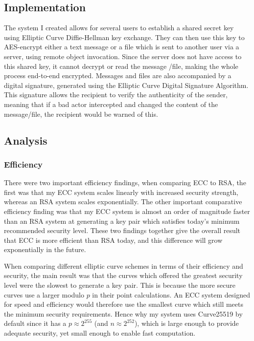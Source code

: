 \documentclass[12pt,a4paper]{article}
\begin{document}
\subsection{Implementation} \noindent
The system I created allows for several users to establish a shared secret key using Elliptic Curve Diffie-Hellman key exchange. 
They can then use this key to AES-encrypt either a text message or a file which is sent to another user via a server, using remote object invocation. 
Since the server does not have access to this shared key, it cannot decrypt or read the message /file, making the whole process end-to-end encrypted. 
Messages and files are also accompanied by a digital signature, generated using the Elliptic Curve Digital Signature Algorithm. 
This signature allows the recipient to verify the authenticity of the sender, meaning that if a bad actor intercepted and changed the content of the message/file, the recipient would be warned of this. 

\subsection{Analysis}

\subsubsection{Efficiency} \noindent
There were two important efficiency findings, when comparing ECC to RSA, 
the first was that my ECC system scales linearly with increased security strength, 
whereas an RSA system scales exponentially. 
The other important comparative efficiency finding was that my ECC system is almost an order of magnitude faster than an RSA system at generating a key pair which satisfies today's minimum recommended security level. 
These two findings together give the overall result that ECC is more efficient than RSA today, 
and this difference will grow exponentially in the future. 

When comparing different elliptic curve schemes in terms of their efficiency and security, 
the main result was that the curves which offered the greatest security level were the slowest to generate a key pair. 
This is because the more secure curves use a larger modulo $p$ in their point calculations. 
An ECC system designed for speed and efficiency would therefore use the smallest curve which still meets the minimum security requirements. 
Hence why my system uses Curve25519 by default since it has a $p \approx 2^{255}$ (and $n \approx 2^{252}$), 
which is large enough to provide adequate security, yet small enough to enable fast computation. 
\end{document}
